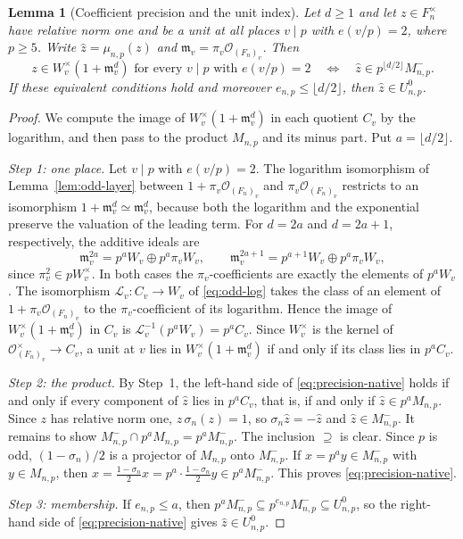\documentclass[11pt]{article}
\theoremstyle{plain}
\newtheorem{lemma}[theorem]{Lemma}
\theoremstyle{definition}
\theoremstyle{remark}
\newcommand{\OO}{\mathcal O}
\begin{document}
\begin{lemma}[Coefficient precision and the unit index]\label{lem:precision-index}
Let $d\ge1$ and let $z\in F_n^\times$ have relative norm one
and be a unit at all places $v\mid p$ with $e(v/p)=2$, where $p\ge5$.
Write $\hat z=\mu_{n,p}(z)$ and
$\mathfrak m_v=\pi_v\OO_{(F_n)_v}$.  Then
\begin{equation}\label{eq:precision-native}
 z\in W_v^\times(1+\mathfrak m_v^d) \text{ for every }v\mid p\text{ with }e(v/p)=2
 \quad\Longleftrightarrow\quad
 \hat z\in p^{\lfloor d/2\rfloor}M_{n,p}^-.
\end{equation}
If these equivalent conditions hold and moreover
$e_{n,p}\le\lfloor d/2\rfloor$, then $\hat z\in U_{n,p}^0$.
\end{lemma}
\begin{proof}
We compute the image of $W_v^\times(1+\mathfrak m_v^d)$ in each quotient
$C_v$ by the logarithm, and then pass to the product $M_{n,p}$ and its
minus part.  Put $a=\lfloor d/2\rfloor$.

\emph{Step 1: one place.}  Let $v\mid p$ with $e(v/p)=2$.  The
logarithm isomorphism of Lemma~\ref{lem:odd-layer} between
$1+\pi_v\OO_{(F_n)_v}$ and $\pi_v\OO_{(F_n)_v}$ restricts to an
isomorphism $1+\mathfrak m_v^d\simeq\mathfrak m_v^d$, because both the
logarithm and the exponential preserve the valuation of the leading term.
For $d=2a$ and $d=2a+1$, respectively, the additive ideals are
\[
 \mathfrak m_v^{2a}=p^aW_v\oplus p^a\pi_vW_v,
 \qquad
 \mathfrak m_v^{2a+1}=p^{a+1}W_v\oplus p^a\pi_vW_v,
\]
since $\pi_v^2\in pW_v^\times$.  In both cases the $\pi_v$-coefficients
are exactly the elements of $p^aW_v$.  The isomorphism
$\mathcal L_v:C_v\to W_v$ of \eqref{eq:odd-log} takes the class of an
element of $1+\pi_v\OO_{(F_n)_v}$ to the $\pi_v$-coefficient of its
logarithm.  Hence the image of $W_v^\times(1+\mathfrak m_v^d)$ in $C_v$ is
$\mathcal L_v^{-1}(p^aW_v)=p^aC_v$.  Since $W_v^\times$ is the kernel of
$\OO_{(F_n)_v}^\times\to C_v$, a unit at $v$ lies in
$W_v^\times(1+\mathfrak m_v^d)$ if and only if its class lies in
$p^aC_v$.

\emph{Step 2: the product.}  By Step~1, the left-hand side of
\eqref{eq:precision-native} holds if and only if every component of $\hat
z$ lies in $p^aC_v$, that is, if and only if $\hat z\in p^aM_{n,p}$.
Since $z$ has relative norm one, $z\,\sigma_n(z)=1$, so
$\sigma_n\hat z=-\hat z$ and $\hat z\in M_{n,p}^-$.  It remains to show
$M_{n,p}^-\cap p^aM_{n,p}=p^aM_{n,p}^-$.  The inclusion $\supseteq$ is
clear.  Since $p$ is odd, $(1-\sigma_n)/2$ is a projector of
$M_{n,p}$ onto $M_{n,p}^-$.  If $x=p^ay\in M_{n,p}^-$ with $y\in
M_{n,p}$, then $x=\frac{1-\sigma_n}2x=p^a\cdot\frac{1-\sigma_n}2y\in
p^aM_{n,p}^-$.  This proves \eqref{eq:precision-native}.

\emph{Step 3: membership.}  If $e_{n,p}\le a$, then
$p^aM_{n,p}^-\subseteq p^{e_{n,p}}M_{n,p}^-\subseteq U_{n,p}^0$, so the
right-hand side of \eqref{eq:precision-native} gives $\hat z\in
U_{n,p}^0$.
\end{proof}
\end{document}

